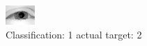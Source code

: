 \begin{figure}[h!]
\begin{center}
\includegraphics[width=0.60\columnwidth]{figures/ID2242_class_1_target_2.png}
\end{center}
\caption{ Classification: 1 actual target: 2}
\label{fig:ID2242_class_1_target_2}
\end{figure}
